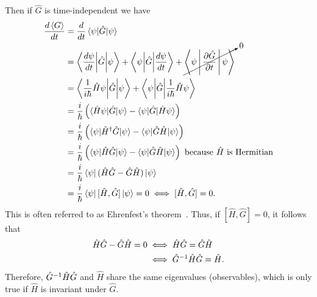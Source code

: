     Then if $\hat{G}$ is time-independent we have
    \begin{align}
        \frac{d\braket{G}}{dt} &= \frac{d}{dt}\braket{\psi|\hat{G}|\psi} \nonumber \\
        &= \Braket{\frac{d\psi}{dt}\biggl|\hat{G}\biggr|\psi} + \Braket{\psi\biggl|\hat{G}\biggr|\frac{d\psi}{dt}} + \cancelto{0}{\Braket{\psi|\frac{\partial \hat{G}}{\partial t}|\psi}} \nonumber \\
        &= \Braket{\frac{1}{i\hbar}\hat{H}\psi\biggl|\hat{G}\biggr|\psi} + \Braket{\psi\biggl|\hat{G}\biggr|\frac{1}{i\hbar}\hat{H}\psi} \nonumber \\
        &= \frac{i}{\hbar}\left( \braket{\hat{H}\psi|\hat{G}|\psi} - \braket{\psi|\hat{G}|\hat{H}\psi} \right) \nonumber \\
        &= \frac{i}{\hbar}\left( \braket{\psi|\hat{H}^\dagger \hat{G}|\psi} - \braket{\psi|\hat{G}\hat{H}|\psi} \right) \nonumber \\
        &= \frac{i}{\hbar}\left( \braket{\psi|\hat{H}\hat{G}|\psi} - \braket{\psi|\hat{G}\hat{H}|\psi} \right) \textrm{ because }\hat{H}\textrm{ is Hermitian} \nonumber \\
        &= \frac{i}{\hbar}\bra{\psi}(\hat{H}\hat{G} - \hat{G}\hat{H})\ket{\psi} \nonumber \\
        &= \frac{i}{\hbar}\bra{\psi}[\hat{H},\hat{G}]\ket{\psi} = 0 \iff [\hat{H},\hat{G}] = 0. \label{eq:cons}
    \end{align}
    This is often referred to as Ehrenfest's theorem~\cite{Griffiths2018}.
    Thus, if $[\hat{H},\hat{G}]=0$, it follows that
    \begin{align*}
        \hat{H}\hat{G}-\hat{G}\hat{H} = 0
            &\iff \hat{H}\hat{G} = \hat{G}\hat{H} \\
            &\iff { \hat{G} }^{-1}\hat{H}\hat{G} = \hat{H}.
    \end{align*}
    Therefore, ${ \hat{G} }^{-1}\hat{H}\hat{G}$ and $\hat{H}$ share the same eigenvalues (observables), which is only true if $\hat{H}$ is invariant under $\hat{G}$.
